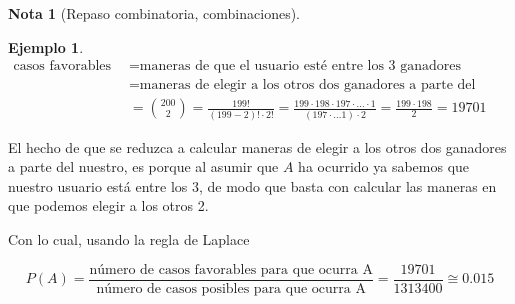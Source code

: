 \documentclass[]{book}
\theoremstyle{plain}
\theoremstyle{definition}
\newtheorem{note}[theorem]{Nota}
\newtheorem{example}[theorem]{Ejemplo}
\begin{document}
\begin{note}[Repaso combinatoria, combinaciones]
\begin{example}
\begin{align*}
  \text{casos favorables para A}&= \text{maneras de que el usuario esté entre los 3 ganadores}\\
  &= \text{maneras de elegir a los otros dos ganadores a parte del nuestro}\\
  &={200 \choose 2} = \frac{199!}{(199-2)! \cdot 2!} = \frac{199 \cdot 198 \cdot 197\cdot\ldots\cdot 1 }{(197 \cdot \ldots 1)\cdot 2} = \frac{199 \cdot 198}{2}= 19701
\end{align*}

El hecho de que se reduzca a calcular maneras de elegir a los otros dos ganadores a parte del nuestro, es porque al asumir que $A$ ha ocurrido ya sabemos que nuestro usuario
está entre los 3, de modo que basta con calcular las maneras en que podemos elegir a los otros 2.

Con lo cual, usando la regla de Laplace

\[P(A) = \frac{\text{número de casos favorables para que ocurra A}}{\text{número de casos posibles para que ocurra A}} = \frac{19701}{1313400}\cong 0.015\]

\end{example}



\end{note}
\end{document}
